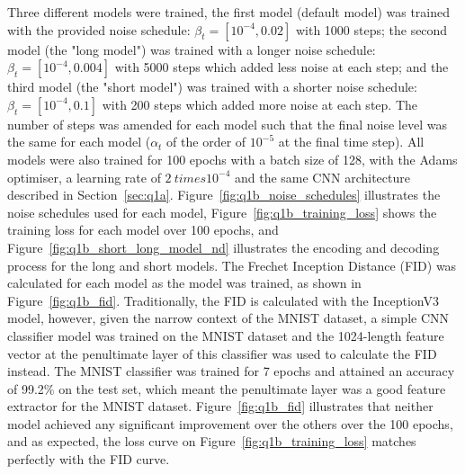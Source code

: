 Three different models were trained, the first model (default model) was trained with the provided noise schedule:
$\beta_{t} = [10^{-4}, 0.02]$ with 1000 steps; the second model (the "long model") was trained with a longer noise schedule:
$\beta_{t} = [10^{-4}, 0.004]$ with 5000 steps which added less noise at each step; and the third model (the "short model")
was trained with a shorter noise schedule: $\beta_{t} = [10^{-4}, 0.1]$ with 200 steps which added more noise at each step.
The number of steps was amended for each model such that the final noise level was the same for each model ($\alpha_{t}$
of the order of $10^{-5}$ at the final time step).
All models were also trained for 100 epochs with a batch size of 128, with the Adams optimiser, a learning rate of
$2 \ times 10^{-4}$ and the same CNN architecture described in Section~\eqref{sec:q1a}.
Figure~\eqref{fig:q1b_noise_schedules} illustrates the noise schedules used for each model, Figure~\eqref{fig:q1b_training_loss}
shows the training loss for each model over 100 epochs, and Figure~\eqref{fig:q1b_short_long_model_nd} illustrates the encoding
and decoding process for the long and short models.
The Frechet Inception Distance (FID) was calculated for each model as the model was trained, as shown in Figure~\eqref{fig:q1b_fid}.
Traditionally, the FID is calculated with the InceptionV3 model, however, given the narrow context of the MNIST dataset,
a simple CNN classifier model was trained on the MNIST dataset and the 1024-length feature vector at
the penultimate layer of this classifier was used to calculate the FID instead.
The MNIST classifier was trained for 7 epochs and attained an accuracy of 99.2\% on the test set, which meant the penultimate
layer was a good feature extractor for the MNIST dataset.
Figure~\eqref{fig:q1b_fid} illustrates that neither model achieved any significant improvement over the others over the
100 epochs, and as expected, the loss curve on Figure~\eqref{fig:q1b_training_loss} matches perfectly with the FID curve.


